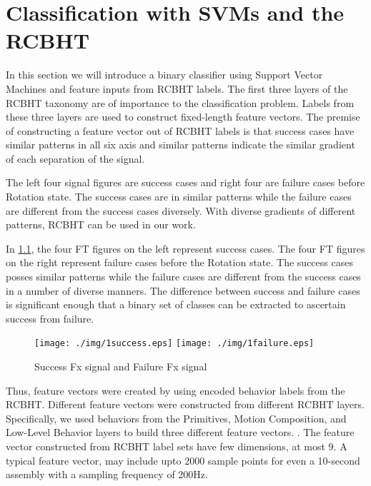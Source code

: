 %

\chapter{Classification with SVMs and the RCBHT}
In this section we will introduce a binary classifier using Support Vector Machines and feature inputs from RCBHT labels. The first three layers of the RCBHT taxonomy are of importance to the classification problem. Labels from these three layers are used to construct fixed-length feature vectors. The premise of constructing a feature vector out of RCBHT labels is that success cases have similar patterns in all six axis and similar patterns indicate the similar gradient of each separation of the signal.

\indent The left four signal figures are success cases and right four are failure cases before Rotation state. The success cases are in similar patterns while the failure cases are different from the success cases diversely. With diverse gradients of different patterns, RCBHT can be used in our work.

\indent In \ref{sfsignal}, the four FT figures on the left represent success cases. The four FT figures on the right represent failure cases before the Rotation state. The success cases posses similar patterns while the failure cases are different from the success cases in a number of diverse manners. The difference between success and failure cases is significant enough that a binary set of classes can be extracted to ascertain success from failure.

\begin{figure}[h]
    \centering
    \texttt{[image: ./img/1success.eps]}
    \texttt{[image: ./img/1failure.eps]}
    \caption{Success Fx signal and Failure Fx signal}
    \label{sfsignal}
\end{figure}

\indent Thus, feature vectors were created by using encoded behavior labels from the RCBHT. Different feature vectors were constructed from different RCBHT layers. Specifically, we used behaviors from the Primitives, Motion Composition, and Low-Level Behavior layers to build three different feature vectors.  . The feature vector constructed from RCBHT label sets have few dimensions, at most 9. A typical feature vector, may include upto 2000 sample points for even a 10-second assembly with a sampling frequency of 200Hz.

